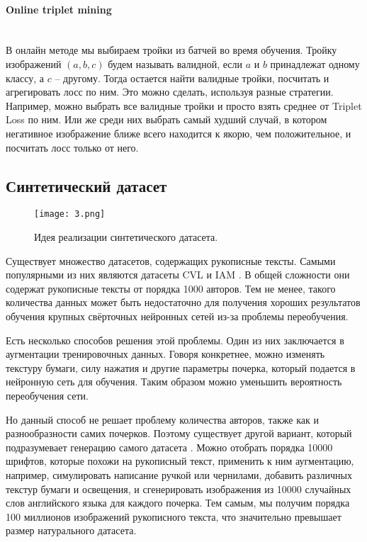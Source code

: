 \paragraph{Online triplet mining}\mbox{} \\

В онлайн методе мы выбираем тройки из батчей во время обучения. Тройку изображений $(a, b, c)$ будем называть валидной, если $a$ и $b$ принадлежат одному классу, а $c$ -- другому. Тогда остается найти валидные тройки, посчитать и агрегировать лосс по ним. Это можно сделать, используя разные стратегии. Например, можно выбрать все валидные тройки и просто взять среднее от Triplet Loss по ним. Или же среди них выбрать самый худший случай, в котором негативное изображение ближе всего находится к якорю, чем положительное, и посчитать лосс только от него.

\subsection{Синтетический датасет}

\begin{figure}[htbp]
    \centering
    \texttt{[image: 3.png]}
    \caption{Идея реализации синтетического датасета.}
    \label{fig:synthetic}
\end{figure}

Существует множество датасетов, содержащих рукописные тексты. Самыми популярными из них являются датасеты CVL \cite{cvl} и IAM \cite{iam}. В общей сложности они содержат рукописные тексты от порядка 1000 авторов. Тем не менее, такого количества данных может быть недостаточно для получения хороших результатов обучения крупных свёрточных нейронных сетей из-за проблемы переобучения. 

Есть несколько способов решения этой проблемы. Один из них заключается в аугментации тренировочных данных. Говоря конкретнее, можно изменять текстуру бумаги, силу нажатия и другие параметры почерка, который подается в нейронную сеть для обучения. Таким образом можно уменьшить вероятность переобучения сети.

Но данный способ не решает проблему количества авторов, также как и разнообразности самих почерков. Поэтому существует другой вариант, который подразумевает генерацию самого датасета \cite{font}. Можно отобрать порядка 10000 шрифтов, которые похожи на рукописный текст, применить к ним аугментацию, например, симулировать написание ручкой или чернилами, добавить различных текстур бумаги и освещения, и сгенерировать изображения из 10000 случайных слов английского языка для каждого почерка. Тем самым, мы получим порядка 100 миллионов изображений рукописного текста, что значительно превышает размер натурального датасета.

